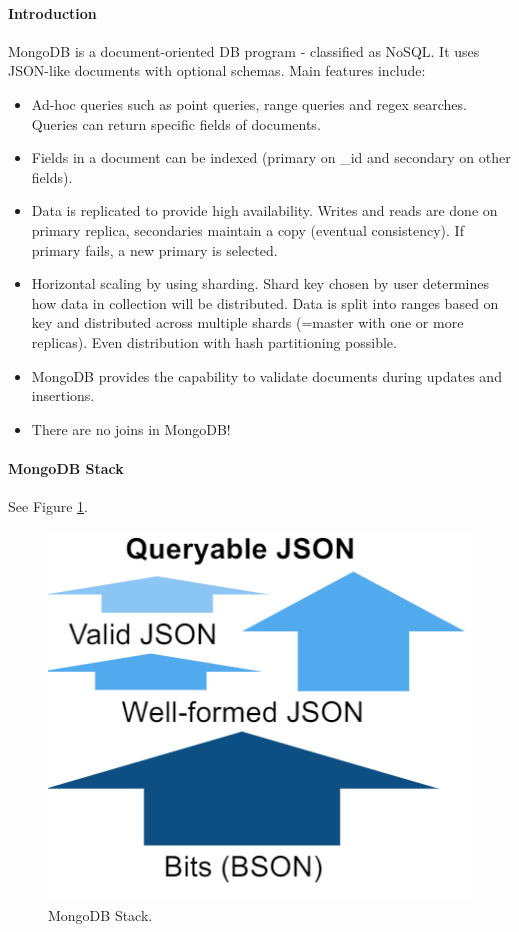 \paragraph{Introduction}
MongoDB is a document-oriented DB program - classified as NoSQL. It uses JSON-like documents with optional schemas. Main features include:
\begin{itemize}
    \item Ad-hoc queries such as point queries, range queries and regex searches. Queries can return specific fields of documents.
    \item Fields in a document can be indexed (primary on \_id and secondary on other fields).
    \item Data is replicated to provide high availability. Writes and reads are done on primary replica, secondaries maintain a copy (eventual consistency). If primary fails, a new primary is selected.
    \item Horizontal scaling by using sharding. Shard key chosen by user determines how data in collection will be distributed. Data is split into ranges based on key and distributed across multiple shards (=master with one or more replicas). Even distribution with hash partitioning possible. %
    \item MongoDB provides the capability to validate documents during updates and insertions.
    \item There are no joins in MongoDB!
\end{itemize}







\paragraph{MongoDB Stack}
See Figure \ref{fig:mdb_stack}.

\begin{figure}[h]
	\centering
	\includegraphics[scale=0.65]{images/5-mdb_stack.PNG}
	\caption{MongoDB Stack.}
	\label{fig:mdb_stack}
\end{figure}


